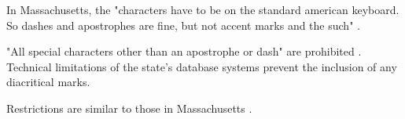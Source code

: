 In Massachusetts, the "characters have to be on the standard american keyboard.
So dashes and apostrophes are fine, but not accent marks and the such"
\parencite{larson11}.

"All special characters other than an apostrophe or dash" are prohibited
\parencite{larson11}. Technical limitations of the state's database systems
prevent the inclusion of any diacritical marks.

Restrictions are similar to those in Massachusetts \parencite{larson11}.
